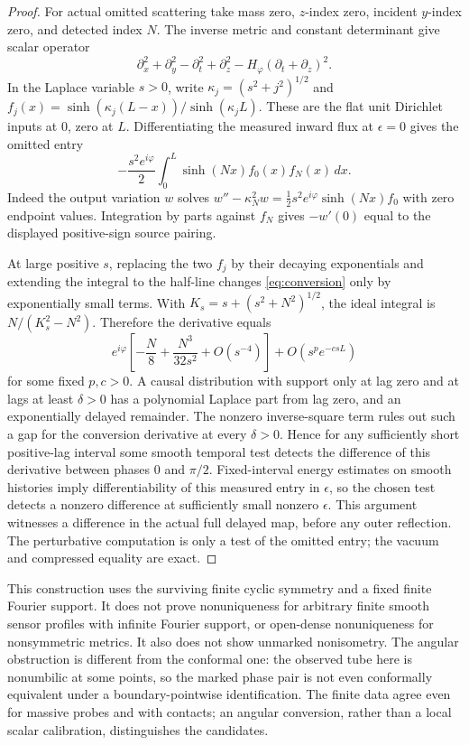 \documentclass[11pt]{article}
\begin{document}
\begin{proof}
For actual omitted scattering take mass zero, \(z\)-index zero, incident \(y\)-index zero, and detected index \(N\). The inverse metric and constant determinant give scalar operator
\[
 \partial_x^2+\partial_y^2-\partial_t^2+\partial_z^2
       -H_\varphi(\partial_t+\partial_z)^2 .
\]
In the Laplace variable \(s>0\), write \(\kappa_j=(s^2+j^2)^{1/2}\) and \(f_j(x)=\sinh(\kappa_j(L-x))/\sinh(\kappa_jL)\). These are the flat unit Dirichlet inputs at \(0\), zero at \(L\). Differentiating the measured inward flux at \(\epsilon=0\) gives the omitted entry
\begin{equation}\label{eq:conversion}
 -\frac{s^2e^{i\varphi}}2\int_0^L \sinh(Nx) f_0(x)f_N(x)\,dx .
\end{equation}
Indeed the output variation \(w\) solves
\(w''-\kappa_N^2 w=\tfrac12s^2e^{i\varphi}\sinh(Nx) f_0\) with zero endpoint values. Integration by parts against \(f_N\) gives \(-w'(0)\) equal to the displayed positive-sign source pairing.

At large positive \(s\), replacing the two \(f_j\) by their decaying exponentials and extending the integral to the half-line changes \eqref{eq:conversion} only by exponentially small terms. With \(K_s=s+(s^2+N^2)^{1/2}\), the ideal integral is \(N/(K_s^2-N^2)\). Therefore the derivative equals
\[
 e^{i\varphi}\left[-\frac{N}{8}+\frac{N^3}{32s^2}
       +O(s^{-4})\right]+O(s^p e^{-c s L})
\]
for some fixed \(p,c>0\). A causal distribution with support only at lag zero and at lags at least \(\delta>0\) has a polynomial Laplace part from lag zero, and an exponentially delayed remainder. The nonzero inverse-square term rules out such a gap for the conversion derivative at every \(\delta>0\). Hence for any sufficiently short positive-lag interval some smooth temporal test detects the difference of this derivative between phases \(0\) and \(\pi/2\). Fixed-interval energy estimates on smooth histories imply differentiability of this measured entry in \(\epsilon\), so the chosen test detects a nonzero difference at sufficiently small nonzero \(\epsilon\). This argument witnesses a difference in the actual full delayed map, before any outer reflection. The perturbative computation is only a test of the omitted entry; the vacuum and compressed equality are exact.
\end{proof}

This construction uses the surviving finite cyclic symmetry and a fixed finite Fourier support. It does not prove nonuniqueness for arbitrary finite smooth sensor profiles with infinite Fourier support, or open-dense nonuniqueness for nonsymmetric metrics. It also does not show unmarked nonisometry. The angular obstruction is different from the conformal one: the observed tube here is nonumbilic at some points, so the marked phase pair is not even conformally equivalent under a boundary-pointwise identification. The finite data agree even for massive probes and with contacts; an angular conversion, rather than a local scalar calibration, distinguishes the candidates.
\end{document}
